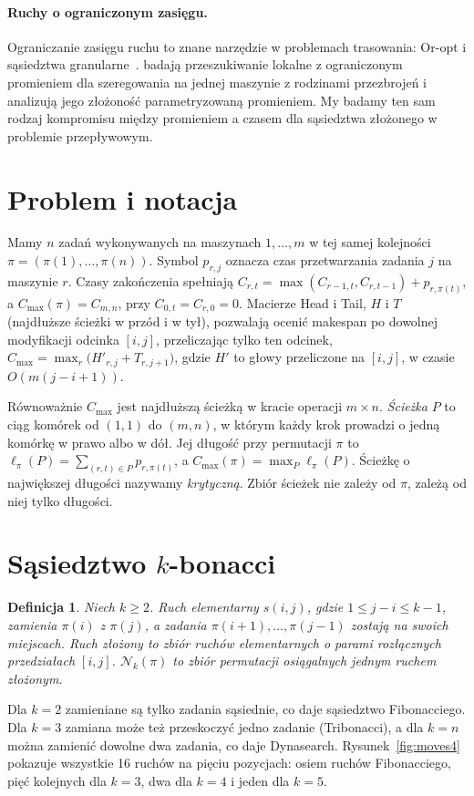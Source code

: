 \documentclass[letterpaper]{article} %
\newtheorem{definition}{Definicja}
\theoremstyle{definition}
\newcommand{\N}{\mathcal{N}}
\begin{document}
\paragraph{Ruchy o ograniczonym zasięgu.} Ograniczanie zasięgu ruchu to znane narzędzie w problemach trasowania: Or-opt i sąsiedztwa
granularne~\cite{toth2003}. \citet{balzereit2024} badają
przeszukiwanie lokalne z ograniczonym promieniem dla szeregowania na
jednej maszynie z rodzinami przezbrojeń i analizują jego złożoność
parametryzowaną promieniem. My badamy ten sam rodzaj kompromisu między
promieniem a czasem dla sąsiedztwa złożonego w problemie przepływowym.

\section{Problem i notacja}\label{sec:problem}
Mamy $n$ zadań wykonywanych na maszynach $1,\dots,m$ w tej samej kolejności $\pi=(\pi(1),\dots,\pi(n))$. Symbol $p_{r,j}$ oznacza czas przetwarzania zadania $j$ na maszynie $r$. Czasy zakończenia spełniają $C_{r,t}=\max(C_{r-1,t},C_{r,t-1})+p_{r,\pi(t)}$, a $C_{\max}(\pi)=C_{m,n}$, przy $C_{0,t}=C_{r,0}=0$. Macierze Head i Tail, $H$ i $T$ (najdłuższe ścieżki w przód i w tył), pozwalają ocenić makespan po dowolnej modyfikacji odcinka $[i,j]$, przeliczając tylko ten odcinek, $C_{\max}=\max_r\bigl(H'_{r,j}+T_{r,j+1}\bigr)$, gdzie $H'$ to głowy przeliczone na $[i,j]$, w czasie $O(m(j-i+1))$.

Równoważnie $C_{\max}$ jest najdłuższą ścieżką w kracie operacji
$m\times n$. \emph{Ścieżka} $P$ to ciąg komórek od $(1,1)$ do $(m,n)$,
w którym każdy krok prowadzi o jedną komórkę w prawo albo w dół. Jej
długość przy permutacji $\pi$ to
$\ell_\pi(P)=\sum_{(r,t)\in P}p_{r,\pi(t)}$, a
$C_{\max}(\pi)=\max_P\ell_\pi(P)$. Ścieżkę o największej długości
nazywamy \emph{krytyczną}. Zbiór ścieżek nie zależy od $\pi$, zależą od
niej tylko długości.

\section{Sąsiedztwo $k$-bonacci}
\begin{definition}
Niech $k\geq 2$. \emph{Ruch elementarny} $s(i,j)$, gdzie $1\leq j-i\leq k-1$,
zamienia $\pi(i)$ z $\pi(j)$, a zadania $\pi(i+1),\dots,\pi(j-1)$ zostają
na swoich miejscach. \emph{Ruch złożony} to zbiór ruchów elementarnych
o parami rozłącznych przedziałach $[i,j]$. $\N_k(\pi)$ to zbiór permutacji osiągalnych jednym ruchem złożonym.
\end{definition}
Dla $k=2$ zamieniane są tylko zadania sąsiednie, co daje sąsiedztwo
Fibonacciego. Dla $k=3$ zamiana może też przeskoczyć jedno zadanie
(Tribonacci), a dla $k=n$ można zamienić dowolne dwa zadania, co daje
Dynasearch. Rysunek~\ref{fig:moves4} pokazuje wszystkie 16 ruchów na pięciu
pozycjach: osiem ruchów Fibonacciego, pięć kolejnych dla $k=3$, dwa dla
$k=4$ i jeden dla $k=5$.
\end{document}
